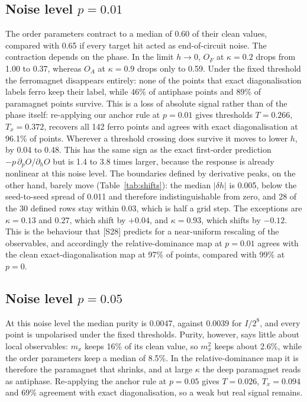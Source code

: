 \documentclass[10pt,twocolumn]{article}
\begin{document}
\subsection{Noise level $p=0.01$}
The order parameters contract to a median of 0.60 of their clean values, compared with 0.65 if every target hit acted as end-of-circuit noise. The contraction depends on the phase. In the limit $h\to0$, $O_F$ at $\kappa=0.2$ drops from 1.00 to 0.37, whereas $O_A$ at $\kappa=0.9$ drops only to 0.59. Under the fixed threshold the ferromagnet disappears entirely: none of the points that exact diagonalisation labels ferro keep their label, while 46\% of antiphase points and 89\% of paramagnet points survive. This is a loss of absolute signal rather than of the phase itself: re-applying our anchor rule at $p=0.01$ gives thresholds $T=0.266$, $T_x=0.372$, recovers all 142 ferro points and agrees with exact diagonalisation at 96.1\% of points. Wherever a threshold crossing does survive it moves to lower $h$, by 0.04 to 0.48. This has the same sign as the exact first-order prediction $-p\,\partial_pO/\partial_hO$ but is 1.4 to 3.8 times larger, because the response is already nonlinear at this noise level. The boundaries defined by derivative peaks, on the other hand, barely move (Table~\ref{tab:shifts}): the median $|\delta h|$ is 0.005, below the seed-to-seed spread of 0.011 and therefore indistinguishable from zero, and 28 of the 30 defined rows stay within 0.03, which is half a grid step. The exceptions are $\kappa=0.13$ and $0.27$, which shift by $+0.04$, and $\kappa=0.93$, which shifts by $-0.12$. This is the behaviour that [S28] predicts for a near-uniform rescaling of the observables, and accordingly the relative-dominance map at $p=0.01$ agrees with the clean exact-diagonalisation map at 97\% of points, compared with 99\% at $p=0$.

\subsection{Noise level $p=0.05$}
At this noise level the median purity is 0.0047, against 0.0039 for $I/2^8$, and every point is unpolarised under the fixed thresholds. Purity, however, says little about local observables: $m_x$ keeps 16\% of its clean value, so $m_x^2$ keeps about 2.6\%, while the order parameters keep a median of 8.5\%. In the relative-dominance map it is therefore the paramagnet that shrinks, and at large $\kappa$ the deep paramagnet reads as antiphase. Re-applying the anchor rule at $p=0.05$ gives $T=0.026$, $T_x=0.094$ and 69\% agreement with exact diagonalisation, so a weak but real signal remains.
\end{document}
